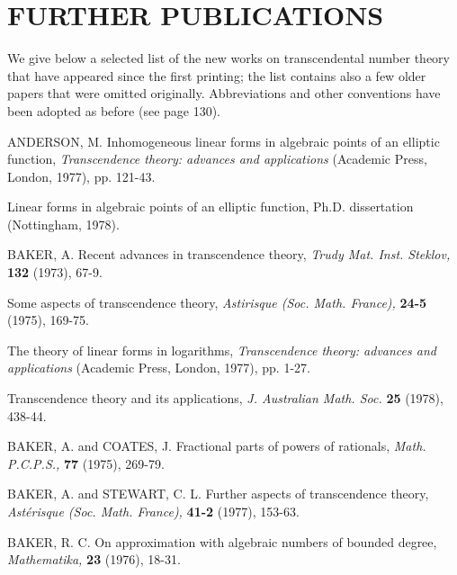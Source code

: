 \chapter*{FURTHER PUBLICATIONS}


We give below a selected list of the new works on transcendental number theory that have appeared since the first printing; the list contains also a few older papers that were omitted originally. Abbreviations and other conventions have been adopted as before (see page 130).


\begin{hanglist}
    \item ANDERSON, M. Inhomogeneous linear forms in algebraic points of an elliptic function, \textit{Transcendence theory: advances and applications} (Academic Press, London, 1977), pp. 121-43.
    \item \hspace{1.5em} Linear forms in algebraic points of an elliptic function, Ph.D. dissertation (Nottingham, 1978).
    \item BAKER, A. Recent advances in transcendence theory, \textit{Trudy Mat. Inst. Steklov,} \textbf{132} (1973), 67-9.
    \item \hspace{1.5em} Some aspects of transcendence theory, \textit{Astirisque (Soc. Math. France),} \textbf{24-5} (1975), 169-75.
    \item \hspace{1.5em} The theory of linear forms in logarithms, \textit{Transcendence theory: advances and applications} (Academic Press, London, 1977), pp. 1-27.
    \item \hspace{1.5em} Transcendence theory and its applications, \textit{J. Australian Math. Soc.} \textbf{25} (1978), 438-44.
    \item BAKER, A. and COATES, J. Fractional parts of powers of rationals, \textit{Math. P.C.P.S.,} \textbf{77} (1975), 269-79.
    \item BAKER, A. and STEWART, C. L. Further aspects of transcendence theory, \textit{Ast\'{e}risque (Soc. Math. France),} \textbf{41-2} (1977), 153-63.
    \item BAKER, R. C. On approximation with algebraic numbers of bounded degree, \textit{Mathematika,} \textbf{23} (1976), 18-31.

\end{hanglist}
